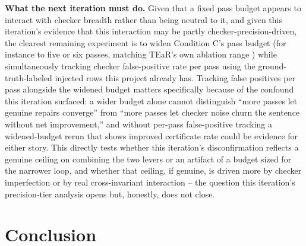 \documentclass[11pt,letterpaper]{article}
\begin{document}
\textbf{What the next iteration must do.} Given that a fixed pass budget appears to interact with checker breadth rather than being neutral to it, and given this iteration's evidence that this interaction may be partly checker-precision-driven, the clearest remaining experiment is to widen Condition C's pass budget (for instance to five or six passes, matching TEaR's own ablation range \citep{Feng2025}) while simultaneously tracking checker false-positive rate per pass using the ground-truth-labeled injected rows this project already has. Tracking false positives per pass alongside the widened budget matters specifically because of the confound this iteration surfaced: a wider budget alone cannot distinguish ``more passes let genuine repairs converge'' from ``more passes let checker noise churn the sentence without net improvement,'' and without per-pass false-positive tracking a widened-budget rerun that shows improved certificate rate could be evidence for either story. This directly tests whether this iteration's disconfirmation reflects a genuine ceiling on combining the two levers or an artifact of a budget sized for the narrower loop, and whether that ceiling, if genuine, is driven more by checker imperfection or by real cross-invariant interaction -- the question this iteration's precision-tier analysis opens but, honestly, does not close.

\section{Conclusion}
\end{document}
